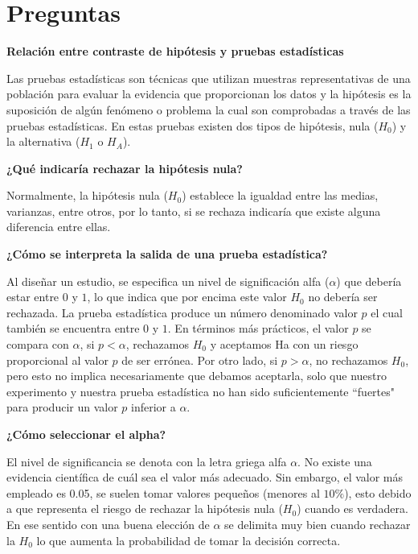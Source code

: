 \documentclass{article}
\begin{document}
\section{Preguntas}

\noindent \textbf{Relación entre contraste de hipótesis y pruebas estadísticas}
    
Las pruebas estadísticas son técnicas que utilizan muestras representativas de una población para evaluar la evidencia que proporcionan los datos y la hipótesis es la suposición de algún fenómeno o problema la cual son comprobadas a través de las pruebas estadísticas. En estas pruebas existen dos tipos de hipótesis, nula ($H_{0}$) y la alternativa ($H_{1}$ o $H_{A}$).

\noindent \textbf{¿Qué indicaría rechazar la hipótesis nula?}

Normalmente, la hipótesis nula ($H_{0}$) establece la igualdad entre las medias, varianzas, entre otros, por lo tanto, si se rechaza indicaría que existe alguna diferencia entre ellas.
    
\noindent \textbf{¿Cómo se interpreta la salida de una prueba estadística?}
    
Al diseñar un estudio, se especifica un nivel de significación alfa ($\alpha$) que debería estar entre $0$ y $1$, lo que indica que por encima este valor $H_{0}$ no debería ser rechazada. La prueba estadística produce un número denominado valor $p$ el cual también se encuentra entre $0$ y $1$. En términos más prácticos, el valor $p$ se compara con $\alpha$, si $p < \alpha$, rechazamos $H_{0}$ y aceptamos Ha con un riesgo proporcional al valor $p$ de ser errónea. Por otro lado, si $p > \alpha$, no rechazamos $H_{0}$, pero esto no implica necesariamente que debamos aceptarla, solo que nuestro experimento y nuestra prueba estadística no han sido suficientemente ``fuertes" para producir un valor $p$ inferior a $\alpha$.

\noindent \textbf{¿Cómo seleccionar el alpha?}
    
El nivel de significancia se denota con la letra griega alfa $\alpha$. No existe una evidencia científica de cuál sea el valor más adecuado. Sin embargo, el valor más empleado es 0.05, se suelen tomar valores pequeños (menores al $10\%$), esto debido a que representa el riesgo de rechazar la hipótesis nula ($H_{0}$) cuando es verdadera. En ese sentido con una buena elección de $\alpha$ se delimita muy bien cuando rechazar la $H_{0}$ lo que aumenta la probabilidad de tomar la decisión correcta.
    
\end{document}
